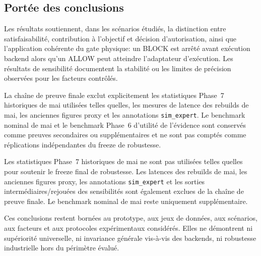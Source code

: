 \subsection{Portée des conclusions}

Les résultats soutiennent, dans les scénarios étudiés, la distinction
entre satisfaisabilité, contribution à l'objectif et décision
d'autorisation, ainsi que l'application cohérente du gate physique:
un BLOCK est arrêté avant exécution backend alors qu'un ALLOW peut
atteindre l'adaptateur d'exécution. Les résultats de sensibilité
documentent la stabilité ou les limites de précision observées pour
les facteurs contrôlés.


La chaîne de preuve finale exclut explicitement les statistiques Phase~7
historiques de mai utilisées telles quelles, les mesures de latence des
rebuilds de mai, les anciennes figures proxy et les annotations
\texttt{sim\_expert}. Le benchmark nominal de mai et le benchmark Phase~6
d'utilité de l'évidence sont conservés comme preuves secondaires ou
supplémentaires et ne sont pas comptés comme réplications indépendantes du
freeze de robustesse.

Les statistiques Phase~7 historiques de mai ne sont pas utilisées telles quelles pour soutenir le freeze final de robustesse. Les latences des rebuilds de mai, les anciennes figures proxy, les annotations \texttt{sim\_expert} et les sorties intermédiaires/rejouées des sensibilités sont également exclues de la chaîne de preuve finale. Le benchmark nominal de mai reste uniquement supplémentaire.

Ces conclusions restent bornées au prototype, aux jeux de données,
aux scénarios, aux facteurs et aux protocoles expérimentaux
considérés. Elles ne démontrent ni supériorité universelle, ni
invariance générale vis-à-vis des backends, ni robustesse
industrielle hors du périmètre évalué.
